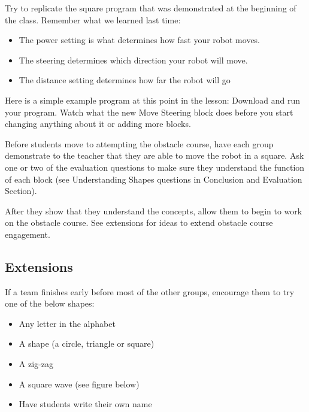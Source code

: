 \documentclass{lessonplan}
\begin{document}
        Try to replicate the square program that was demonstrated at the beginning of the class. 
        Remember what we learned last time:
        \begin{itemize}
            \item The power setting is what determines how fast your robot moves.
            \item The steering determines which direction your robot will move.
            \item The distance setting determines how far the robot will go
        \end{itemize}
        
        Here is a simple example program at this point in the lesson:
        Download and run your program. Watch what the new Move Steering block does before you start changing anything about it or adding more blocks.

        \par
        Before students move to attempting the obstacle course, have each group demonstrate to the teacher that they are able to move the robot in a square. Ask one or two of the evaluation questions to make sure they understand the function of each block (see Understanding Shapes questions in Conclusion and Evaluation Section). 
        
        After they show that they understand the concepts, allow them to begin to work on the obstacle course. See extensions for ideas to extend obstacle course engagement.
        


    \subsection{Extensions}
        If a team finishes early before most of the other groups, encourage them to try one of the below shapes:
        \begin{itemize}
            \item Any letter in the alphabet
            \item A shape (a circle, triangle or square) 
            \item A zig-zag
            \item A square wave (see figure below)
     	  \item Have students write their own name
        \end{itemize}
    
              
\end{document}
